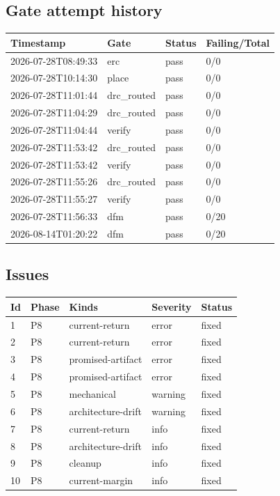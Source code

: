 \documentclass[11pt,a4paper]{article}
\begin{document}
\subsection*{Gate attempt history}
{\small
\begin{longtable}{llll}
\toprule
\textbf{Timestamp} & \textbf{Gate} & \textbf{Status} & \textbf{Failing/Total} \\
\midrule
\endhead
2026-07-28T08:49:33 & erc & pass & 0/0 \\
2026-07-28T10:14:30 & place & pass & 0/0 \\
2026-07-28T11:01:44 & drc\_routed & pass & 0/0 \\
2026-07-28T11:04:29 & drc\_routed & pass & 0/0 \\
2026-07-28T11:04:44 & verify & pass & 0/0 \\
2026-07-28T11:53:42 & drc\_routed & pass & 0/0 \\
2026-07-28T11:53:42 & verify & pass & 0/0 \\
2026-07-28T11:55:26 & drc\_routed & pass & 0/0 \\
2026-07-28T11:55:27 & verify & pass & 0/0 \\
2026-07-28T11:56:33 & dfm & pass & 0/20 \\
2026-08-14T01:20:22 & dfm & pass & 0/20 \\
\bottomrule
\end{longtable}
}
\subsection*{Issues}
{\small
\begin{longtable}{llp{5cm}ll}
\toprule
\textbf{Id} & \textbf{Phase} & \textbf{Kinds} & \textbf{Severity} & \textbf{Status} \\
\midrule
\endhead
1 & P8 & current-return & error & fixed \\
2 & P8 & current-return & error & fixed \\
3 & P8 & promised-artifact & error & fixed \\
4 & P8 & promised-artifact & error & fixed \\
5 & P8 & mechanical & warning & fixed \\
6 & P8 & architecture-drift & warning & fixed \\
7 & P8 & current-return & info & fixed \\
8 & P8 & architecture-drift & info & fixed \\
9 & P8 & cleanup & info & fixed \\
10 & P8 & current-margin & info & fixed \\
\bottomrule
\end{longtable}
}
\end{document}
